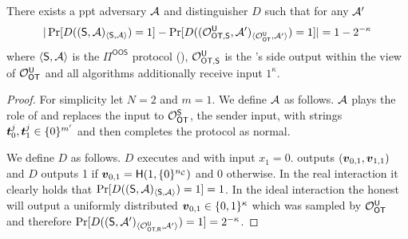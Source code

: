 \begin{lemma} 
	There exists a ppt adversary $\Adv$ and distinguisher $D$ such that for any $\Adv'$ 
	$$
	|\Pr[D((\send, \Adv)_{\langle\send, \Adv\rangle})=1]-\Pr[D((\O^{\U}_{\textsf{OT,\send}}, \Adv')_{\langle\OOT^\U, \Adv'\rangle})=1]|=1-2^{-\kappa}
	$$
	where $\langle\send, \Adv\rangle$ is the $\Pi^{\textsf{OOS}}$ protocol (), $\O^{\U}_{\textsf{OT,\send}}$ is the \rec's side output within the view of $\OOT^{\U}$ and all algorithms additionally receive input $1^\kappa$. 
\end{lemma}
\begin{proof}
	For simplicity let $N=2$ and $m=1$. We define $\Adv$ as follows. $\Adv$ plays the role of \rec and replaces the input to $\OOT^\send$, the sender input, with strings $\tt_0^j,\tt_1^j\in \{0\}^{m'}$ and then completes the protocol as normal.
	
	We define $D$ as follows. $D$ executes \send and \Adv with input $x_1=0$. \send outputs $(\vv_{0,1},\vv_{1,1})$ and $D$ outputs 1 if $\vv_{0,1}=\H(1, \{0\}^\nc)$ and 0 otherwise. In the real interaction it clearly holds that $\Pr[D((\send, \Adv)_{\langle\send, \Adv\rangle})=1]=1$. In the ideal interaction the honest \send will output a uniformly distributed $\vv_{0,1}\in\{0,1\}^\kappa$ which was sampled by $\OOT^{\U}$ and therefore $\Pr[D((\send, \Adv')_{\langle\O^{\U}_{\textsf{OT,\rec}}, \Adv'\rangle})=1]=2^{-\kappa}$.
\end{proof}




